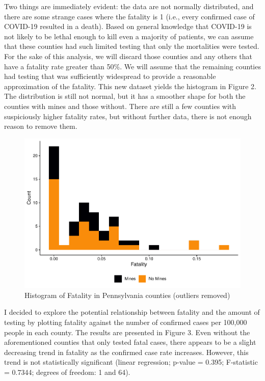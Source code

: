 \documentclass[
  12pt,
]{article}
\begin{document}
Two things are immediately evident: the data are not normally
distributed, and there are some strange cases where the fatality is 1
(i.e., every confirmed case of COVID-19 resulted in a death). Based on
general knowledge that COVID-19 is not likely to be lethal enough to
kill even a majority of patients, we can assume that these counties had
such limited testing that only the mortalities were tested. For the sake
of this analysis, we will discard those counties and any others that
have a fatality rate greater than 50\%. We will assume that the
remaining counties had testing that was sufficiently widespread to
provide a reasonable approximation of the fatality. This new dataset
yields the histogram in Figure 2. The distribution is still not normal,
but it has a smoother shape for both the counties with mines and those
without. There are still a few counties with suspiciously higher
fatality rates, but without further data, there is not enough reason to
remove them.

\begin{figure}
\centering
\includegraphics{Hancock_ENV872_Project_files/figure-latex/PA Histogram2-1.pdf}
\caption{Histogram of Fatality in Pennsylvania counties (outliers
removed)}
\end{figure}

I decided to explore the potential relationship between fatality and the
amount of testing by plotting fatality against the number of confirmed
cases per 100,000 people in each county. The results are presented in
Figure 3. Even without the aforementioned counties that only tested
fatal cases, there appears to be a slight decreasing trend in fatality
as the confirmed case rate increases. However, this trend is not
statistically significant (linear regression; p-value = 0.395;
F-statistic = 0.7344; degrees of freedom: 1 and 64).
\end{document}
